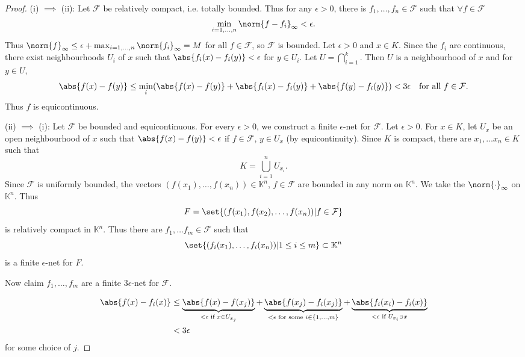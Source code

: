 \documentclass{article}
\newcommand{\K}{\mathbb{K}}
\begin{document}
\begin{proof}
    (i) $\implies$ (ii):
    Let $\mathcal{F}$ be relatively compact, i.e. totally bounded.
    Thus for any $\epsilon > 0$, there is $f_1, \dotsc, f_n \in \mathcal{F}$ such that $\forall f \in \mathcal{F}$
    \begin{equation*}
        \min_{i=1, \dotsc, n} \norm{f - f_i}_\infty < \epsilon.
    \end{equation*}
    Thus $\norm{f}_\infty \leq \epsilon + \max_{i = 1, \dotsc, n} \norm{f_i}_\infty = M$ for all $f \in \mathcal{F}$, so $\mathcal{F}$ is bounded.
    Let $\epsilon > 0$ and $x \in K$. Since the $f_i$ are continuous, there exist neighbourhoods $U_i$ of $x$ such that $\abs{f_i(x) - f_i(y)} < \epsilon$ for $y \in U_i$. Let $U = \bigcap_{i=1}^k$. Then $U$ is a neighbourhood of $x$ and for $y \in U$,
    \begin{equation*}
        \abs{f(x) - f(y)} \leq \min_i(\abs{f(x) - f(y)} + \abs{f_i(x) - f_i(y)} + \abs{f(y) - f_i(y)}) < 3\epsilon \quad \text{for all } f \in \mathcal{F}.
    \end{equation*}
    Thus $f$ is equicontinuous.

    (ii) $\implies$  (i):
    Let $\mathcal{F}$ be bounded and equicontinuous. For every $\epsilon > 0$, we construct a finite $\epsilon$-net for $\mathcal{F}$. Let $\epsilon > 0$.
    For $x \in K$, let $U_x$ be an open neighbourhood of $x$ such that $\abs{f(x) - f(y)} < \epsilon$ if $f \in \mathcal{F}$, $y \in U_x$ (by equicontinuity). Since $K$ is compact, there are $x_1, \dotsc x_n \in K$ such that
    \begin{equation*}
        K = \bigcup_{i=1}^n U_{x_i}.
    \end{equation*}
    Since $\mathcal{F}$ is uniformly bounded, the vectors $(f(x_1), \dotsc, f(x_n)) \in \K^n$, $f \in \mathcal{F}$ are bounded in any norm on $\K^n$. We take the $\norm{\cdot}_\infty$ on $\K^n$. Thus
    \begin{equation*}
        F = \set{(f(x_1), f(x_2), \dotsc, f(x_n)) | f \in \mathcal{F}}
    \end{equation*}
    is relatively compact in $\K^n$.
    Thus there are $f_1, \dotsc f_m \in \mathcal{F}$ such that
    \begin{equation*}
        \set{(f_i(x_1), \dotsc, f_i(x_n)) | 1 \leq i \leq m} \subset \K^n
    \end{equation*}
    is a finite $\epsilon$-net for $F$.

    Now claim $f_1, \dotsc, f_m$ are a finite $3\epsilon$-net for $\mathcal{F}$.

    \begin{align*}
        \abs{f(x) - f_i(x)} &\leq \underbrace{\abs{f(x) - f(x_j)}}_{< \epsilon \text{ if } x \in U_{x_j}} +
        \underbrace{\abs{f(x_j) - f_i(x_j)}}_{< \epsilon \text{ for some } i \in \{1, \dotsc, m\}} +
        \underbrace{\abs{f_i(x_i) - f_i(x)}}_{< \epsilon \text{ if } U_{x_i} \ni x} \\
            &< 3 \epsilon
    \end{align*}
    for some choice of $j$.
\end{proof}
\end{document}
